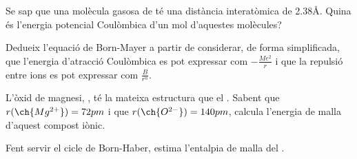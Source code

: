 \begin{exr}{}
Se sap que una molècula gasosa de  té una distància interatòmica de 2.38\AA. Quina és l'energia potencial Coulòmbica d'un mol d'aquestes molècules?
\end{exr}
\begin{exr}{}
    Dedueix l'equació de Born-Mayer a partir de considerar, de forma simplificada, que l'energia d'atracció Coulòmbica es pot expressar com $-\frac{Me^2}{r}$ i que la repulsió entre ions es pot expressar com $\frac{B}{r^n}$.
    \end{exr}
    \begin{exr}{}
    L'òxid de magnesi, , té la mateixa estructura que el . Sabent que $r(\ch{Mg^{2+}})=72pm$ i que $r(\ch{O^{2-}})=140pm$, calcula l'energia de malla d'aquest compost iònic.
    \end{exr}
    
    \begin{exr}{}
    Fent servir el cicle de Born-Haber, estima l'entalpia de malla del .
    \end{exr}
